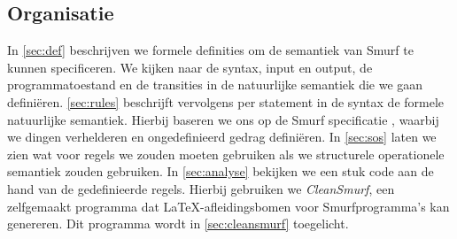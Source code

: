 \subsection{Organisatie} %

In \autoref{sec:def} beschrijven we formele definities om de semantiek van
Smurf te kunnen specificeren. We kijken naar de syntax, input en output, de
programmatoestand en de transities in de natuurlijke semantiek die we gaan
definiëren. \autoref{sec:rules} beschrijft vervolgens per statement in de
syntax de formele natuurlijke semantiek. Hierbij baseren we ons op de Smurf
specificatie \cite{safalra}, waarbij we dingen verhelderen en ongedefinieerd
gedrag definiëren. In \autoref{sec:sos} laten we zien wat voor regels we zouden
moeten gebruiken als we structurele operationele semantiek zouden gebruiken. In
\autoref{sec:analyse} bekijken we een stuk code aan de hand van de
gedefinieerde regels. Hierbij gebruiken we \emph{CleanSmurf}, een zelfgemaakt
programma dat \LaTeX-afleidingsbomen voor Smurfprogramma's kan genereren. Dit
programma wordt in \autoref{sec:cleansmurf} toegelicht.
